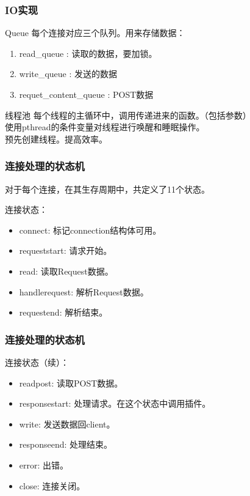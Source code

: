 \documentclass[10pt,dvipdfm]{beamer}
\begin{document}
\begin{frame}
	\frametitle{IO实现}
	\begin{block}{Queue}
		每个连接对应三个队列。用来存储数据：
		\begin{enumerate}
			\item read\_queue : 读取的数据，要加锁。
			\item write\_queue : 发送的数据
			\item requet\_content\_queue : POST数据
		\end{enumerate}
	\end{block}
	\pause
	\begin{block}{线程池}
		每个线程的主循环中，调用传递进来的函数。（包括参数）\\
		使用pthread的条件变量对线程进行唤醒和睡眠操作。\\
		预先创建线程。提高效率。
	\end{block}
\end{frame}

\begin{frame}
	\frametitle{连接处理的状态机}
	对于每个连接，在其生存周期中，共定义了11个状态。
	
	
	\begin{block}{连接状态：}
		\begin{itemize}
			\item connect: 标记connection结构体可用。
			\item requeststart: 请求开始。
			\item read: 读取Request数据。
			\item handlerequest: 解析Request数据。
			\item requestend: 解析结束。
		\end{itemize}
	\end{block}
\end{frame}

\begin{frame}
	\frametitle{连接处理的状态机}
	\begin{block}{连接状态（续）：}
		\begin{itemize}
			\item readpost: 读取POST数据。
			\item responsestart: 处理请求。在这个状态中调用插件。
			\item write: 发送数据回client。
			\item responseend: 处理结束。
			\item error: 出错。
			\item close: 连接关闭。
		\end{itemize}
	\end{block}
\end{frame}
\end{document}
